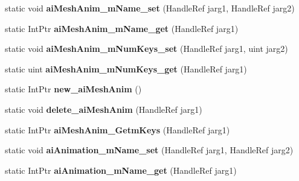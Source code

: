 \begin{DoxyCompactItemize}
\item 
\hypertarget{class_assimp_p_i_n_v_o_k_e_a3e7433321a3477480f5807ee9423f194}{static void {\bfseries ai\+Mesh\+Anim\+\_\+m\+Name\+\_\+set} (Handle\+Ref jarg1, Handle\+Ref jarg2)}\label{class_assimp_p_i_n_v_o_k_e_a3e7433321a3477480f5807ee9423f194}

\item 
\hypertarget{class_assimp_p_i_n_v_o_k_e_ac6523178c9e0767f3fb20b08ce6a1c4e}{static Int\+Ptr {\bfseries ai\+Mesh\+Anim\+\_\+m\+Name\+\_\+get} (Handle\+Ref jarg1)}\label{class_assimp_p_i_n_v_o_k_e_ac6523178c9e0767f3fb20b08ce6a1c4e}

\item 
\hypertarget{class_assimp_p_i_n_v_o_k_e_ae99af01dc2c594fbb81940646e67ee22}{static void {\bfseries ai\+Mesh\+Anim\+\_\+m\+Num\+Keys\+\_\+set} (Handle\+Ref jarg1, uint jarg2)}\label{class_assimp_p_i_n_v_o_k_e_ae99af01dc2c594fbb81940646e67ee22}

\item 
\hypertarget{class_assimp_p_i_n_v_o_k_e_a647fa98351d8102bd6ed28234cfc7bf3}{static uint {\bfseries ai\+Mesh\+Anim\+\_\+m\+Num\+Keys\+\_\+get} (Handle\+Ref jarg1)}\label{class_assimp_p_i_n_v_o_k_e_a647fa98351d8102bd6ed28234cfc7bf3}

\item 
\hypertarget{class_assimp_p_i_n_v_o_k_e_a90d90c7c3849a8cb56a5df67e9a0d1f1}{static Int\+Ptr {\bfseries new\+\_\+ai\+Mesh\+Anim} ()}\label{class_assimp_p_i_n_v_o_k_e_a90d90c7c3849a8cb56a5df67e9a0d1f1}

\item 
\hypertarget{class_assimp_p_i_n_v_o_k_e_a7c6a95918715cfc6bd3671e0876cd61d}{static void {\bfseries delete\+\_\+ai\+Mesh\+Anim} (Handle\+Ref jarg1)}\label{class_assimp_p_i_n_v_o_k_e_a7c6a95918715cfc6bd3671e0876cd61d}

\item 
\hypertarget{class_assimp_p_i_n_v_o_k_e_afd970f7e68b0db529ff833d3f737b1d0}{static Int\+Ptr {\bfseries ai\+Mesh\+Anim\+\_\+\+Getm\+Keys} (Handle\+Ref jarg1)}\label{class_assimp_p_i_n_v_o_k_e_afd970f7e68b0db529ff833d3f737b1d0}

\item 
\hypertarget{class_assimp_p_i_n_v_o_k_e_abbfbde156d7c48783c00b0eb6d82f1b6}{static void {\bfseries ai\+Animation\+\_\+m\+Name\+\_\+set} (Handle\+Ref jarg1, Handle\+Ref jarg2)}\label{class_assimp_p_i_n_v_o_k_e_abbfbde156d7c48783c00b0eb6d82f1b6}

\item 
\hypertarget{class_assimp_p_i_n_v_o_k_e_a2b81e7af8ad9a3bc4ade64f5bcf95a49}{static Int\+Ptr {\bfseries ai\+Animation\+\_\+m\+Name\+\_\+get} (Handle\+Ref jarg1)}\label{class_assimp_p_i_n_v_o_k_e_a2b81e7af8ad9a3bc4ade64f5bcf95a49}


\end{DoxyCompactItemize}
